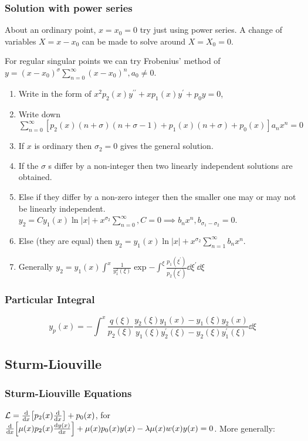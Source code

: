 \documentclass[8pt]{extarticle}
\newcommand{\Lh}{ {\mathcal{L}} }
\begin{document}
\begin{multicols*}{3}
\subsubsection{Solution with power series}
About an ordinary point, $x=x_0=0$ try just using power series. A change of
variables $X=x-x_0$ can be made to solve around $X=X_0=0$.

For regular singular points we can try Frobenius' method of $y = (x-x_0)^\sigma
\sum_{n=0}^\infty (x-x_0)^n, a_0 \neq 0$.
\begin{enumerate}
    \item Write in the form of $x^2 p_2(x) y^{\prime\prime} + x p_1(x) y^\prime
        + p_0 y = 0$,
    \item Write down $\sum_{n=0}^\infty [p_2(x) (n+\sigma) (n+\sigma-1) +
        p_1(x) (n+\sigma) + p_0(x)] a_n x^n = 0$
    \item If $x$ is ordinary then $\sigma_2 = 0$ gives the general solution.
    \item If the $\sigma$ s differ by a non-integer then two linearly
        independent solutions are obtained.
    \item Else if they differ by a non-zero integer then the smaller one may or
        may not be linearly independent. $y_2 = Cy_1(x)\ln|x| + x^{\sigma_2}
        \sum_{n=0}^\infty, C=0 \implies b_n x^n, b_{\sigma_1 - \sigma_2} = 0$.
    \item Else (they are equal) then $y_2 = y_1(x)\ln|x| + x^{\sigma_2}
        \sum_{n=1}^\infty b_n x^n$.
    \item Generally $y_2 = y_1(x) \int^x \frac{1}{y_1^2 (\xi)} \exp{-\int^\xi
        \frac{p_1(\xi^\prime)}{p_2(\xi^\prime)} \dd{\xi^\prime}} \dd{\xi}$
\end{enumerate}

\subsubsection{Particular Integral}
\begin{equation*}
    y_p(x) = -\int^x \frac{q(\xi)}{p_2(\xi)} \frac{y_2(\xi)y_1(x) -
    y_1(\xi)y_2(x)}{y_1(\xi)y_2^\prime(\xi) - y_2(\xi)y_1^\prime(\xi)}
    \dd{\xi}
\end{equation*}

\subsection{Sturm-Liouville}
\subsubsection{Sturm-Liouville Equations}
$\Lh = \dv{}{x}\qty[p_2(x)\dv{}{x}] + p_0(x)$, for
$\dv{}{x}\qty[\mu(x)p_2(x) \dv{y(x)}{x}] + \mu(x)p_0(x)y(x) - \lambda
\mu(x)w(x)y(x) = 0$. More generally:


\end{multicols*}
\end{document}

